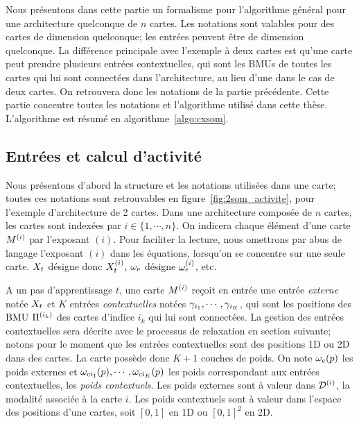 Nous présentons dans cette partie un formalisme pour l'algorithme général pour une architecture quelconque de $n$ cartes. Les notations sont valables pour des cartes de dimension quelconque; les entrées peuvent être de dimension quelconque.
La différence principale avec l'exemple à deux cartes est qu'une carte peut prendre plusieurs entrées contextuelles, qui sont les BMUs de toutes les cartes qui lui sont connectées dans l'architecture, au lieu d'une dans le cas de deux cartes. On retrouvera donc les notations de la partie précédente.
Cette partie concentre toutes les notations et l'algorithme utilisé dans cette thèse. L'algorithme est résumé en algorithme~\ref{algo:cxsom}.

\subsection{Entrées et calcul d'activité}
Nous présentons d'abord la structure et les notations utilisées dans une carte; toutes ces notations sont retrouvables en figure~\ref{fig:2som_activite}, pour l'exemple d'architecture de 2 cartes. Dans une architecture composée de $n$ cartes, les cartes sont indexées par $i \in \{1,\cdots,n\}$. On indicera chaque élément d'une carte $M^{({i})}$ par l'exposant $(i)$.
Pour faciliter la lecture, nous omettrons par abus de langage l'exposant $(i)$ dans les équations, lorsqu'on se concentre sur une seule carte. $X_t$ désigne donc $X_t^{({i})}$, $\omega_e$ désigne $\omega_e^{({i})}$, etc.


A un pas d'apprentissage $t$, une carte $M^{({i})}$ reçoit en entrée une entrée \emph{externe} notée $X_t$ et $K$ entrées \emph{contextuelles} notées $\gamma_{i_1},\cdots,\gamma_{i_K}$, qui sont les positions des BMU $\Pi^{({i_k})}$ des cartes d'indice $i_k$ qui lui sont connectées. La gestion des entrées contextuelles sera décrite avec le processus de relaxation en section suivante; notons pour le moment que les entrées contextuelles sont des positions 1D ou 2D dans des cartes. 
La carte possède donc $K+1$ couches de poids. On  note $\omega_e(p)$ les poids externes et $\omega_{ci_1}(p), \cdots, \omega_{ci_K}(p)$ les poids correspondant aux entrées contextuelles, les \emph{poids contextuels}. Les poids externes sont à valeur dans $\mathcal{D}^{({i})}$, la modalité associée à la carte $i$. Les poids contextuels sont à valeur dans l'espace des positions d'une cartes, soit $[0,1]$ en 1D ou $[0,1]^2$ en 2D.

